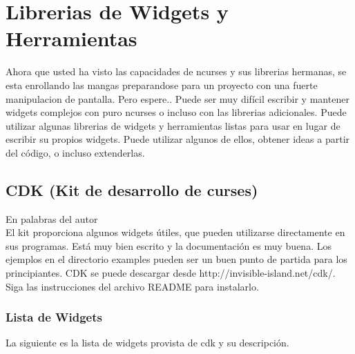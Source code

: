 \documentclass{article}
\begin{document}
\section{Librerias de Widgets y Herramientas}%
Ahora que usted ha visto las capacidades de ncurses y sus librerias hermanas,
se esta enrollando las mangas preparandose para un proyecto con una fuerte
manipulacion de pantalla. Pero espere.. Puede ser muy difícil escribir y
mantener widgets complejos con puro ncurses o incluso con las librerias
adicionales. Puede utilizar algunas librerias de widgets y herramientas listas
para usar en lugar de escribir su propios widgets. Puede utilizar algunos de
ellos, obtener ideas a partir del código, o incluso extenderlas.

\subsection{CDK (Kit de desarrollo de curses)}%
En palabras del autor\\

El kit proporciona algunos widgets útiles, que pueden utilizarse directamente
en sus programas. Está muy bien escrito y la documentación es muy buena. Los
ejemplos en el directorio examples pueden ser un buen punto de partida para los
principiantes. CDK se puede descargar desde http://invisible-island.net/cdk/.
Siga las instrucciones del archivo README para instalarlo.

\subsubsection{Lista de Widgets}%
La siguiente es la lista de widgets provista de cdk y su descripción.
\end{document}
